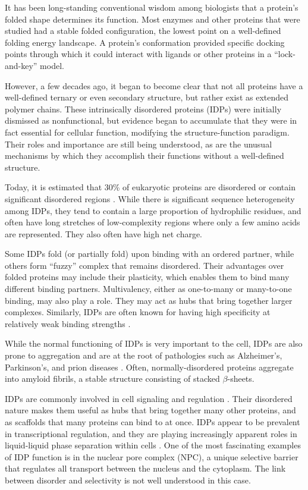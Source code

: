 It has been long-standing conventional wisdom among biologists that a protein's folded shape determines its function.  Most enzymes and other proteins that were studied had a stable folded configuration, the lowest point on a well-defined folding energy landscape.  A protein's conformation provided specific docking points through which it could interact with ligands or other proteins in a ``lock-and-key'' model.

However, a few decades ago, it began to become clear that not all proteins have a well-defined ternary or even secondary structure, but rather exist as extended polymer chains.  These intrinsically disordered proteins (IDPs) were initially dismissed as nonfunctional, but evidence began to accumulate that they were in fact essential for cellular function, modifying the structure-function paradigm.  Their roles and importance are still being understood, as are the unusual mechanisms by which they accomplish their functions without a well-defined structure.

Today, it is estimated that 30\% of eukaryotic proteins are disordered or contain significant disordered regions \cite{uversky13}.  While there is significant sequence heterogeneity among IDPs, they tend to contain a large proportion of hydrophilic residues, and often have long stretches of low-complexity regions where only a few amino acids are represented.  They also often have high net charge.

Some IDPs fold (or partially fold) upon binding with an ordered partner, while others form ``fuzzy'' complex that remains disordered.  Their advantages over folded proteins may include their plasticity, which enables them to bind many different binding partners.  Multivalency, either as one-to-many or many-to-one binding, may also play a role.  They may act as hubs that bring together larger complexes.  Similarly, IDPs are often known for having high specificity at relatively weak binding strengths \cite{wright15, aramburu17}.

While the normal functioning of IDPs is very important to the cell, IDPs are also prone to aggregation and are at the root of pathologies such as Alzheimer's, Parkinson's, and prion diseases \cite{babu11}.  Often, normally-disordered proteins aggregate into amyloid fibrils, a stable structure consisting of stacked $\beta$-sheets.

IDPs are commonly involved in cell signaling and regulation \cite{wright15}.  Their disordered nature makes them useful as hubs that bring together many other proteins, and as scaffolds that many proteins can bind to at once.  IDPs appear to be prevalent in transcriptional regulation, and they are playing increasingly apparent roles in liquid-liquid phase separation within cells \cite{brangwynne15}.  One of the most fascinating examples of IDP function is in the nuclear pore complex (NPC), a unique selective barrier that regulates all transport between the nucleus and the cytoplasm.  The link between disorder and selectivity is not well understood in this case.

